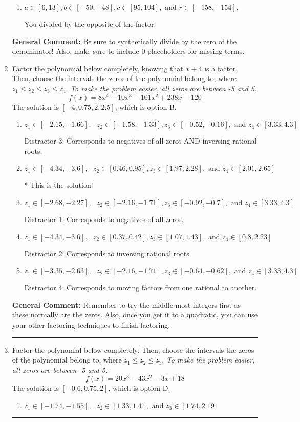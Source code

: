 \documentclass{extbook}[14pt]
\newcommand{\litem}[1]{\item #1

\rule{\textwidth}{0.4pt}}
\begin{document}
\begin{enumerate}
{\begin{enumerate}[label=\Alph*.]
* This is the solution!
\item \( a \in [6, 13], b \in [-50, -48], c \in [95, 104], \text{ and } r \in [-158, -154]. \)

 You divided by the opposite of the factor.
\end{enumerate}

\textbf{General Comment:} Be sure to synthetically divide by the zero of the denominator! Also, make sure to include 0 placeholders for missing terms.
}
\litem{
Factor the polynomial below completely, knowing that $x + 4$ is a factor. Then, choose the intervals the zeros of the polynomial belong to, where $z_1 \leq z_2 \leq z_3 \leq z_4$. \textit{To make the problem easier, all zeros are between -5 and 5.}
\[ f(x) = 8x^{4} -10 x^{3} -101 x^{2} +238 x -120 \]The solution is \( [-4, 0.75, 2, 2.5] \), which is option B.\begin{enumerate}[label=\Alph*.]
\item \( z_1 \in [-2.15, -1.66], \text{   }  z_2 \in [-1.58, -1.33], z_3 \in [-0.52, -0.16], \text{   and   } z_4 \in [3.33, 4.3] \)

 Distractor 3: Corresponds to negatives of all zeros AND inversing rational roots.
\item \( z_1 \in [-4.34, -3.6], \text{   }  z_2 \in [0.46, 0.95], z_3 \in [1.97, 2.28], \text{   and   } z_4 \in [2.01, 2.65] \)

* This is the solution!
\item \( z_1 \in [-2.68, -2.27], \text{   }  z_2 \in [-2.16, -1.71], z_3 \in [-0.92, -0.7], \text{   and   } z_4 \in [3.33, 4.3] \)

 Distractor 1: Corresponds to negatives of all zeros.
\item \( z_1 \in [-4.34, -3.6], \text{   }  z_2 \in [0.37, 0.42], z_3 \in [1.07, 1.43], \text{   and   } z_4 \in [0.8, 2.23] \)

 Distractor 2: Corresponds to inversing rational roots.
\item \( z_1 \in [-3.35, -2.63], \text{   }  z_2 \in [-2.16, -1.71], z_3 \in [-0.64, -0.62], \text{   and   } z_4 \in [3.33, 4.3] \)

 Distractor 4: Corresponds to moving factors from one rational to another.
\end{enumerate}

\textbf{General Comment:} Remember to try the middle-most integers first as these normally are the zeros. Also, once you get it to a quadratic, you can use your other factoring techniques to finish factoring.
}
\litem{
Factor the polynomial below completely. Then, choose the intervals the zeros of the polynomial belong to, where $z_1 \leq z_2 \leq z_3$. \textit{To make the problem easier, all zeros are between -5 and 5.}
\[ f(x) = 20x^{3} -43 x^{2} -3 x + 18 \]The solution is \( [-0.6, 0.75, 2] \), which is option D.\begin{enumerate}[label=\Alph*.]
\item \( z_1 \in [-1.74, -1.55], \text{   }  z_2 \in [1.33, 1.4], \text{   and   } z_3 \in [1.74, 2.19] \)


\end{enumerate}}
\end{enumerate}
\end{document}
